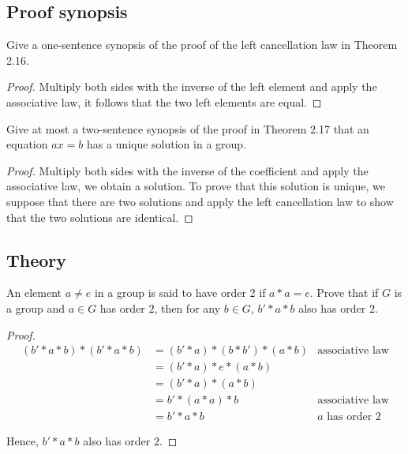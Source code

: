 \subsection*{Proof synopsis}

\newpage
\begin{exercise}
    Give a one-sentence synopsis of the proof of the left cancellation law in Theorem 2.16.
\end{exercise}

\begin{proof}
    Multiply both sides with the inverse of the left element and apply the associative law, it follows that the two left elements are equal.
\end{proof}

\newpage
\begin{exercise}
    Give at most a two-sentence synopsis of the proof in Theorem 2.17 that an equation $ax = b$ has a unique solution in a group.
\end{exercise}

\begin{proof}
    Multiply both sides with the inverse of the coefficient and apply the associative law, we obtain a solution. To prove that this solution is unique, we suppose that there are two solutions and apply the left cancellation law to show that the two solutions are identical.
\end{proof}

\subsection*{Theory}

\newpage
\begin{exercise}
    An element $a\ne e$ in a group is said to have order $2$ if $a * a = e$. Prove that if $G$ is a group and $a\in G$ has order $2$, then for any $b\in G$, $b' * a * b$ also has order $2$.
\end{exercise}

\begin{proof}
    \begin{align*}
        (b' * a * b) * (b' * a * b) & = (b' * a) * (b * b') * (a * b) & \text{associative law}   \\
                                    & = (b' * a) * e * (a * b)                                   \\
                                    & = (b' * a) * (a * b)                                       \\
                                    & = b' * (a * a) * b              & \text{associative law}   \\
                                    & = b' * a * b                    & \text{$a$ has order $2$}
    \end{align*}

    Hence, $b' * a * b$ also has order $2$.
\end{proof}

